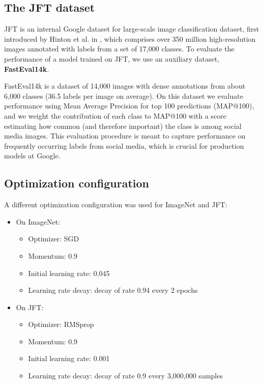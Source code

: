 \subsection{The JFT dataset}

JFT is an internal Google dataset for large-scale image classification dataset, first introduced by Hinton et al. in \cite{hinton15}, which comprises over 350 million high-resolution images annotated with labels from a set of 17,000 classes. To evaluate the performance of a model trained on JFT, we use an auxiliary dataset, \textbf{FastEval14k}.

FastEval14k is a dataset of 14,000 images with dense annotations from about 6,000 classes (36.5 labels per image on average). On this dataset we evaluate performance using Mean Average Precision for top 100 predictions (MAP@100), and we weight the contribution of each class to MAP@100 with a score estimating how common (and therefore important) the class is among social media images. This evaluation procedure is meant to capture performance on frequently occurring labels from social media, which is crucial for production models at Google.

\subsection{Optimization configuration}

A different optimization configuration was used for ImageNet and JFT:

\begin{itemize}
\item On ImageNet:
  \begin{itemize}
  \item Optimizer: SGD \item Momentum: 0.9
  \item Initial learning rate: 0.045
  \item Learning rate decay: decay of rate 0.94 every 2 epochs
  \end{itemize}

\item On JFT:
  \begin{itemize}
  \item Optimizer: RMSprop \cite{rmsprop}
  \item Momentum: 0.9
  \item Initial learning rate: 0.001
  \item Learning rate decay: decay of rate 0.9 every 3,000,000 samples
  \end{itemize}

\end{itemize}

